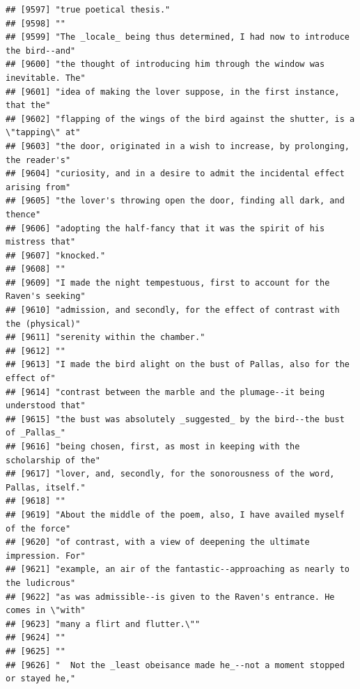 \documentclass{article}\usepackage[]{graphicx}\usepackage[]{color}
\makeatletter
\newenvironment{kframe}{%
 \def\at@end@of@kframe{}%
 \ifinner\ifhmode%
  \def\at@end@of@kframe{\end{minipage}}%
  \begin{minipage}{\columnwidth}%
 \fi\fi%
 \def\FrameCommand##1{\hskip\@totalleftmargin \hskip-\fboxsep
 \colorbox{shadecolor}{##1}\hskip-\fboxsep
     \hskip-\linewidth \hskip-\@totalleftmargin \hskip\columnwidth}%
 \MakeFramed {\advance\hsize-\width
   \@totalleftmargin\z@ \linewidth\hsize
   \@setminipage}}%
 {\par\unskip\endMakeFramed%
 \at@end@of@kframe}
\newenvironment{knitrout}{}{} %
\makeatother
\begin{document}
\begin{knitrout}
\begin{kframe}
\begin{verbatim}
## [9597] "true poetical thesis."                                                       
## [9598] ""                                                                            
## [9599] "The _locale_ being thus determined, I had now to introduce the bird--and"    
## [9600] "the thought of introducing him through the window was inevitable. The"       
## [9601] "idea of making the lover suppose, in the first instance, that the"           
## [9602] "flapping of the wings of the bird against the shutter, is a \"tapping\" at"  
## [9603] "the door, originated in a wish to increase, by prolonging, the reader's"     
## [9604] "curiosity, and in a desire to admit the incidental effect arising from"      
## [9605] "the lover's throwing open the door, finding all dark, and thence"            
## [9606] "adopting the half-fancy that it was the spirit of his mistress that"         
## [9607] "knocked."                                                                    
## [9608] ""                                                                            
## [9609] "I made the night tempestuous, first to account for the Raven's seeking"      
## [9610] "admission, and secondly, for the effect of contrast with the (physical)"     
## [9611] "serenity within the chamber."                                                
## [9612] ""                                                                            
## [9613] "I made the bird alight on the bust of Pallas, also for the effect of"        
## [9614] "contrast between the marble and the plumage--it being understood that"       
## [9615] "the bust was absolutely _suggested_ by the bird--the bust of _Pallas_"       
## [9616] "being chosen, first, as most in keeping with the scholarship of the"         
## [9617] "lover, and, secondly, for the sonorousness of the word, Pallas, itself."     
## [9618] ""                                                                            
## [9619] "About the middle of the poem, also, I have availed myself of the force"      
## [9620] "of contrast, with a view of deepening the ultimate impression. For"          
## [9621] "example, an air of the fantastic--approaching as nearly to the ludicrous"    
## [9622] "as was admissible--is given to the Raven's entrance. He comes in \"with"     
## [9623] "many a flirt and flutter.\""                                                 
## [9624] ""                                                                            
## [9625] ""                                                                            
## [9626] "  Not the _least obeisance made he_--not a moment stopped or stayed he,"     

\end{verbatim}
\end{kframe}
\end{knitrout}
\end{document}
